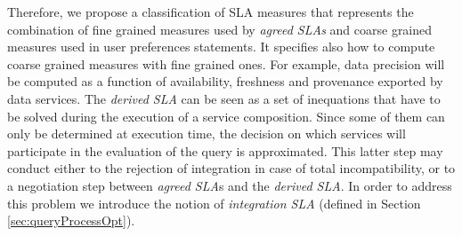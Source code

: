 Therefore, we propose a classification of SLA measures that represents the combination of fine grained measures used by {\em agreed SLAs} and coarse grained measures used in user preferences statements. 
It specifies also how to compute coarse grained measures with fine grained ones. 
For example, data precision will be computed as a function of availability, freshness and provenance exported by data services. The {\em derived SLA} can be seen as a set of inequations that have to be solved during the execution of a service composition. Since some of them can only be determined at execution time, the decision on which services will participate in the evaluation of the query is approximated.  
This latter step may conduct either to the rejection of integration in case of total incompatibility, or to a negotiation step between {\em agreed SLA}s and the {\em derived SLA}. In order to address this problem we introduce the notion of  {\em integration SLA} (defined in  Section \ref{sec:queryProcessOpt}). 
 
 

